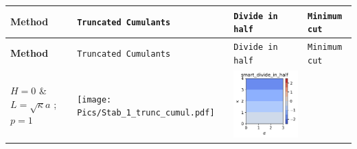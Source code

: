 \begin{landscape}
\begin{longtable}{|p{3cm}|p{7.2cm}|p{7.2cm}|p{7.2cm}|}
    \hline
    \textbf{Method} & \texttt{Truncated Cumulants} & \texttt{Divide in half}  & \texttt{Minimum cut} \\
    \hline
    \endfirsthead
        
    \textbf{Method} & \texttt{Truncated Cumulants} & \texttt{Divide in half}  & \texttt{Minimum cut} \\
    \hline
    \endhead
        
    \hline
    \endfoot

    \hline
    \endlastfoot
        
    $H=0$ \& $L = \sqrt{\kappa} a$ ; $p=1$ &
    \begin{minipage}{7cm}
        \centering
        \texttt{[image: Pics/Stab\_1\_trunc\_cumul.pdf]}
    \end{minipage}&
    \begin{minipage}{7cm}
        \centering
        \includegraphics[width=\textwidth]{Pics/Stab_1_divide_in_half.pdf}
    \end{minipage}&
    \begin{minipage}{7cm}
        \centering

\end{minipage}
\end{longtable}
\end{landscape}
